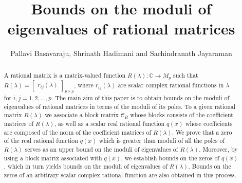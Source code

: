 \documentclass[12pt, reqno]{amsart}
\theoremstyle{definition}
\theoremstyle{remark}
\numberwithin{equation}{section}
\begin{document}
\setcounter{page}{1}

\title[Eigenvalue bounds]
{Bounds on the moduli of eigenvalues of rational matrices}
	
\author[Pallavi, Shrinath and Sachindranath]{Pallavi Basavaraju, Shrinath Hadimani 
and Sachindranath Jayaraman}
\address{School of Mathematics\\ 
Indian Institute of Science Education and Research Thiruvananthapuram\\ 
Maruthamala P.O., Vithura, Thiruvananthapuram -- 695 551, Kerala, India.}
	
	
	
	
\begin{abstract} 
A rational matrix is a matrix-valued function 
$R(\lambda): \mathbb{C} \rightarrow M_p$ such that $R(\lambda) = \begin{bmatrix}
r_{ij}(\lambda)
\end{bmatrix} _{p\times p}$, where $r_{ij}(\lambda)$ are scalar complex rational 
functions in $\lambda$ for $i,j=1,2,\ldots,p$. The main aim of this paper is to 
obtain bounds on the moduli of eigenvalues of rational matrices in terms of 
the moduli of its poles. To a given rational matrix $R(\lambda)$ we associate a 
block matrix $\mathcal{C}_R$ whose blocks consists of the coefficient matrices of 
$R(\lambda)$, as well as a scalar real rational function $q(x)$ whose coefficients 
are composed of the norm of the coefficient matrices of $R(\lambda)$. We prove 
that a zero of the real rational function $q(x)$ which is greater than moduli 
of all the poles of $R(\lambda)$ serves as an upper bound on the moduli of 
eigenvalues of $R(\lambda)$. Moreover, by using a block matrix associated with 
$q(x)$, we establish bounds on the zeros of $q(x)$, which in turn yields  
bounds on the moduli of eigenvalues of $R(\lambda)$. Bounds on the zeros of an 
arbitrary scalar complex rational function are also obtained in this process.

\end{abstract}
	
\maketitle
	
\end{document}
